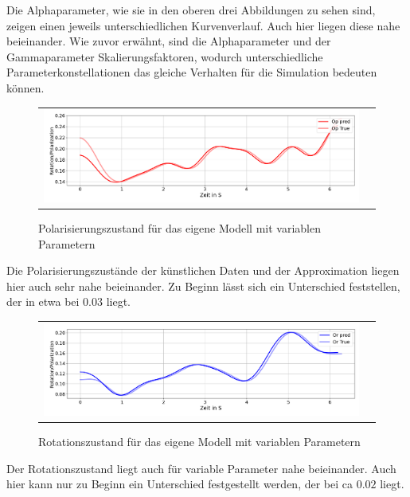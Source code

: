 Die Alphaparameter, wie sie in den oberen drei Abbildungen zu sehen sind, zeigen einen jeweils unterschiedlichen Kurvenverlauf.
Auch hier liegen diese nahe beieinander. Wie zuvor erwähnt, sind die Alphaparameter und der Gammaparameter Skalierungsfaktoren, wodurch unterschiedliche Parameterkonstellationen das gleiche Verhalten für die Simulation bedeuten können.
\begin{figure}[H]
\centering
\begin{tabular}{cc}
\includegraphics[width=1.0\textwidth]{figures/Experimente/Parameter_variabel/PWD_POL.png} 
\end{tabular}
\caption{Polarisierungszustand für das eigene Modell mit variablen Parametern \label{fig:PWD_PV_POL}}
\end{figure}

Die Polarisierungszustände der künstlichen Daten und der Approximation liegen hier auch sehr nahe beieinander.
Zu Beginn lässt sich ein Unterschied feststellen, der in etwa bei $0.03$ liegt.

\begin{figure}[H]
\centering
\begin{tabular}{cc}
\includegraphics[width=1.0\textwidth]{figures/Experimente/Parameter_variabel/PWD_ROT.png} 
\end{tabular}
\caption{Rotationszustand für das eigene Modell mit variablen Parametern\label{fig:PWD_PV_ROT}}
\end{figure}

Der Rotationszustand liegt auch für variable Parameter nahe beieinander. Auch hier kann nur zu Beginn ein Unterschied festgestellt werden, der bei ca $0.02$ liegt.

